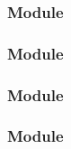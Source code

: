 \documentclass[t, notes, xcolor=table]{beamer}
\begin{document}
\begin{frame}
\frametitle{Module}

\end{frame}

\begin{frame}
\frametitle{Module}

\end{frame}

\begin{frame}
\frametitle{Module}

\end{frame}

\begin{frame}
\frametitle{Module}

\end{frame}
\end{document}
